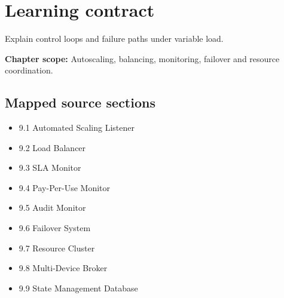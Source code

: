 \documentclass[10pt,letterpaper]{article}
\begin{document}
\sourceStatement
\tableofcontents
\newpage
\section{Learning contract}
\begin{takeaway}
Explain control loops and failure paths under variable load.
\end{takeaway}
\textbf{Chapter scope:} Autoscaling, balancing, monitoring, failover and resource coordination.\\
\subsection{Mapped source sections}
\begin{itemize}
\item 9.1 Automated Scaling Listener
\item 9.2 Load Balancer
\item 9.3 SLA Monitor
\item 9.4 Pay-Per-Use Monitor
\item 9.5 Audit Monitor
\item 9.6 Failover System
\item 9.7 Resource Cluster
\item 9.8 Multi-Device Broker
\item 9.9 State Management Database
\end{itemize}
\end{document}
